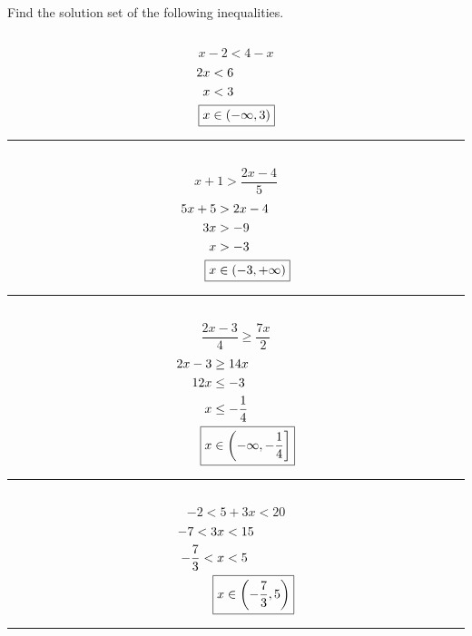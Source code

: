 


\section{}
	Find the solution set of the following inequalities.

	\subsection{}
		\[x - 2 < 4 - x\]
		\begin{align*}
			2x &< 6 \\
			x &< 3 \\
			\Aboxed{x &\in (-\infty, 3)}
		\end{align*}
		\hrule{}

	\subsection{}
		\[x + 1 > \frac{2x - 4}{5}\]
		\begin{align*}
			5x + 5 &> 2x - 4 \\
			3x &> -9 \\
			x &> -3 \\
			\Aboxed{x &\in (-3, +\infty)}
		\end{align*}
		\hrule{}

	\subsection{}
		\[\frac{2x - 3}{4} \geq \frac{7x}{2}\]
		\begin{align*}
			2x - 3 &\geq 14x \\
			12x &\leq -3 \\
			x &\leq -\frac{1}{4} \\
			\Aboxed{x &\in \left(-\infty, -\frac{1}{4}\right]}
		\end{align*}
		\hrule{}

	\subsection{}
		\[-2 < 5 + 3x < 20\]
		\begin{align*}
			-7 < 3x &< 15 \\
			-\frac{7}{3} < x &< 5 \\
			\Aboxed{x &\in \left(-\frac{7}{3}, 5\right)}
		\end{align*}
		\hrule{}

